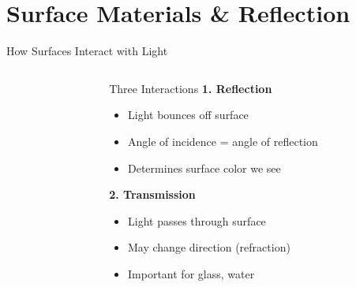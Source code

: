 \section{Surface Materials \& Reflection}

\begin{frame}{How Surfaces Interact with Light}
  \begin{columns}
    \begin{column}{0.5\textwidth}
    \end{column}
    \begin{column}{0.5\textwidth}
      \begin{conceptbox}{Three Interactions}
        \pause
        \textbf{1. Reflection}
        \begin{itemize}
            \footnotesize
          \item Light bounces off surface
          \item Angle of incidence = angle of reflection
          \item Determines surface color we see
        \end{itemize}

        \pause
        \textbf{2. Transmission}
        \begin{itemize}
            \footnotesize
          \item Light passes through surface
          \item May change direction (refraction)
          \item Important for glass, water
        \end{itemize}


\end{conceptbox}
\end{column}
\end{columns}
\end{frame}
